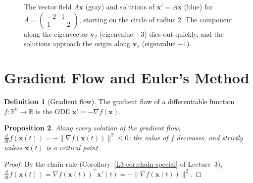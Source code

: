 \documentclass[11pt]{article}
\newcommand{\norm}[1]{\lVert #1 \rVert}
\theoremstyle{definition}
\newtheorem{definition}{Definition}[section]
\theoremstyle{plain}
\newtheorem{proposition}[definition]{Proposition}
\theoremstyle{remark}
\begin{document}
\begin{figure}[ht]
    \centering
    \caption{The vector field $A\mathbf{x}$ (gray) and solutions of $\mathbf{x}' = A\mathbf{x}$ (blue) for $A = \left(\begin{smallmatrix} -2 & 1 \\ 1 & -2 \end{smallmatrix}\right)$, starting on the circle of radius $2$. The component along the eigenvector $\mathbf{v}_2$ (eigenvalue $-3$) dies out quickly, and the solutions approach the origin along $\mathbf{v}_1$ (eigenvalue $-1$).}
    \label{fig:ode}
\end{figure}

\section{Gradient Flow and Euler's Method}\label{sec:euler}


\begin{definition}[Gradient flow]\label{def:gradient-flow}
    The gradient flow of a differentiable function $f: \mathbb{R}^n \to \mathbb{R}$ is the ODE $\mathbf{x}' = -\nabla f(\mathbf{x})$.
\end{definition}

\begin{proposition}\label{prop:gradient-flow}
    Along every solution of the gradient flow, $\frac{d}{dt}f(\mathbf{x}(t)) = -\norm{\nabla f(\mathbf{x}(t))}^2 \leq 0$: the value of $f$ decreases, and strictly unless $\mathbf{x}(t)$ is a critical point.
\end{proposition}

\begin{proof}
    By the chain rule (Corollary~\ref{L3-cor:chain-special} of Lecture~3), $\frac{d}{dt}f(\mathbf{x}(t)) = \nabla f(\mathbf{x}(t))^\top\mathbf{x}'(t) = -\norm{\nabla f(\mathbf{x}(t))}^2$.
\end{proof}
\end{document}
